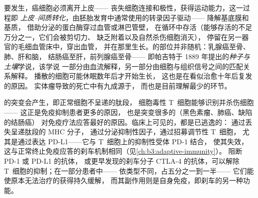 \begin{definition}[侵袭与转移]\label{def:b3:cancer-biology:metastasis}
要发生，癌细胞必须离开上皮——
丧失细胞连接和极性，获得运动能力，这一过程即
\emph{上皮–间质转化}，由胚胎发育中通常使用的转录因子驱动——
降解基底膜和基质，
借助分泌的蛋白酶穿过血管或淋巴管壁，
在循环中存活（能够存活的不足万分之一，它们会被剪切力、
缺乏附着以及自然杀伤细胞消灭），
停留在另一器官的毛细血管床中，穿出血管，
并在那里生长。的部位并非随机：乳腺癌至骨、肺、肝和脑，
结肠癌至肝，前列腺癌至骨——
即帕吉特于 1889 年提出的\emph{种子与土壤}学说，该学说
一部分由血流解释，另一部分由细胞与组织信号之间的匹配关系解释。
播散的细胞可能休眠数年后才开始生长，
这也是在看似治愈十年后复发的原因。
实体瘤导致的死亡中有九成源于，
而也是目前理解最少的环节。
\end{definition}

\begin{proposition}[逃避免疫系统]\label{prop:b3:cancer-biology:immune}
的突变会产生\emph{}，即正常细胞不呈递的肽段，
细胞毒性 T~细胞能够识别并杀伤细胞——
这正是免疫抑制患者更多的原因，
也是突变很多的（黑色素瘤、肺癌、缺陷的结肠癌）
对免疫疗法应答最好的原因。临床上可见的，都是已逃逸的：
通过丢失呈递肽段的 MHC 分子，
通过分泌抑制性因子，通过招募调节性 T~细胞，
尤其是通过表达 PD-L1——它与 T~细胞上的抑制性受体 PD-1 结合，
使其失效，
这与正常终止免疫应答的刹车机制相同（见\cref{ch:b3:adaptive-immunity}）。
阻断 PD-1 或 PD-L1 的抗体，
或更早发现的刹车分子 CTLA-4 的抗体，可以解除 T~细胞的抑制；在一部分患者中——
依类型不同，占五分之一到一半——
它们能使原本无法治疗的获得持久缓解，
而其副作用则是自身免疫，即刹车的另一种功能。
\end{proposition}

